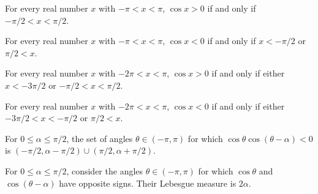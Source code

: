 \begin{theorem}
\label{FABL.cos_pos_iff_of_neg_pi_lt_of_lt_pi}
\leanok
{}
For every real number $x$ with $-\pi<x<\pi$, $\cos x>0$ if and only if $-\pi/2<x<\pi/2$.
\end{theorem}

\begin{theorem}
\label{FABL.cos_neg_iff_of_neg_pi_lt_of_lt_pi}
\leanok
{}
For every real number $x$ with $-\pi<x<\pi$, $\cos x<0$ if and only if $x< -\pi/2$ or
$\pi/2<x$.
\end{theorem}

\begin{theorem}
\label{FABL.cos_pos_iff_of_neg_two_pi_lt_of_lt_pi}
\leanok
{}
For every real number $x$ with $-2\pi<x<\pi$, $\cos x>0$ if and only if either
$x<-3\pi/2$ or $-\pi/2<x<\pi/2$.
\end{theorem}

\begin{theorem}
\label{FABL.cos_neg_iff_of_neg_two_pi_lt_of_lt_pi}
\leanok
{}
For every real number $x$ with $-2\pi<x<\pi$, $\cos x<0$ if and only if either
$-3\pi/2<x<-\pi/2$ or $\pi/2<x$.
\end{theorem}

\begin{theorem}
\label{FABL.angularDisagreementSet_eq_of_le_half_pi}
\leanok
{}
For $0\leq\alpha\leq\pi/2$, the set of angles $\theta\in(-\pi,\pi)$ for which
$\cos\theta\cos(\theta-\alpha)<0$ is
$(-\pi/2,\alpha-\pi/2)\cup(\pi/2,\alpha+\pi/2)$.
\end{theorem}

\begin{theorem}
\label{FABL.volume_angularDisagreementSet_of_le_half_pi}
\leanok
{}
For $0\leq\alpha\leq\pi/2$, consider the angles $\theta\in(-\pi,\pi)$ for which
$\cos\theta$ and $\cos(\theta-\alpha)$ have opposite signs. Their Lebesgue measure is
$2\alpha$.
\end{theorem}


